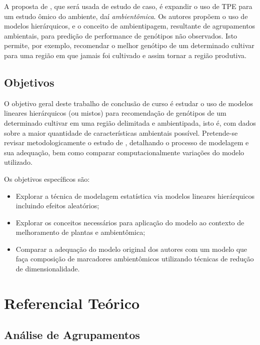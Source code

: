 \documentclass[12pt, a4paper, twoside]{report}
\numberwithin{equation}{subsection} %
\begin{document}
A proposta de \citep{resende2020enviromics}, que será usada de estudo de caso, é expandir o uso de TPE para um estudo ômico do ambiente, daí \textit{ambientômica}. Os autores propõem o uso de modelos hierárquicos, e o conceito de ambientipagem, resultante de agrupamentos ambientais, para predição de performance de genótipos não observados. Isto permite, por exemplo, recomendar o melhor genótipo de um determinado cultivar para uma região em que jamais foi cultivado e assim tornar a região produtiva.

\section{Objetivos}

O objetivo geral deste trabalho de conclusão de curso é estudar o uso de modelos lineares hierárquicos (ou mistos) para recomendação de genótipos de um determinado cultivar em uma região delimitada e ambientipada, isto é, com dados sobre a maior quantidade de características ambientais possível. Pretende-se revisar metodologicamente o estudo de \citep{resende2020enviromics}, detalhando o processo de modelagem e sua adequação, bem como comparar computacionalmente variações do modelo utilizado.

 
Os objetivos específicos são:

  \begin{itemize}
  \item Explorar a técnica de modelagem estatística via modelos lineares hierárquicos incluindo efeitos aleatórios;
  \item Explorar os conceitos necessários para aplicação do modelo ao contexto de melhoramento de plantas e ambientômica;
  \item Comparar a adequação do modelo original dos autores com um modelo que faça composição de marcadores ambientômicos utilizando técnicas de redução de dimensionalidade.
 \end{itemize}
 
 
 
 \chapter{Referencial Teórico}
 
 \section{Análise de Agrupamentos}
 
\end{document}
